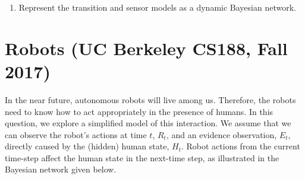 \documentclass[11pt, a4paper]{article}
\begin{document}
\begin{enumerate}
    \item Represent the transition and sensor models as a dynamic Bayesian network.


\end{enumerate}

\newpage

\section{Robots (UC Berkeley CS188, Fall 2017)}

In the near future, autonomous robots will live among us. Therefore, the robots need to know how to act appropriately in the presence of humans. In this question, we explore a simplified model of this interaction. We assume that we can observe the robot's actions at time $t$, $R_t$, and an evidence observation, $E_t$, directly caused by the (hidden) human state, $H_t$. Robot actions from the current time-step affect the human state in the next-time step, as illustrated in the Bayesian network given below.
\end{document}
